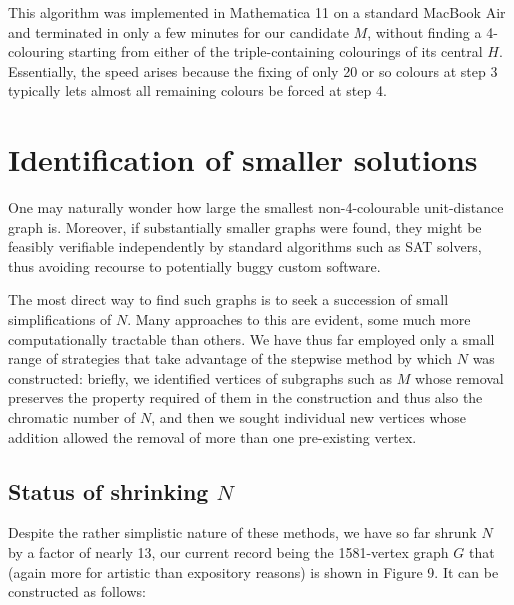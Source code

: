 \documentclass{amsart}
\theoremstyle{definition}
\theoremstyle{remark}
\numberwithin{equation}{section}
\begin{document}
This algorithm was implemented in Mathematica 11 on a standard MacBook Air and terminated in only a few minutes for our candidate $M$, without finding a 4-colouring starting from either of the triple-containing colourings of its central $H$. Essentially, the speed arises because the fixing of only 20 or so colours at step 3 typically lets almost all remaining colours be forced at step 4.

\section{Identification of smaller solutions}

One may naturally wonder how large the smallest non-4-colourable unit-distance graph is. Moreover, if substantially smaller graphs were found, they might be feasibly verifiable independently by standard algorithms such as SAT solvers, thus avoiding recourse to potentially buggy custom software.

The most direct way to find such graphs is to seek a succession of small simplifications of $N$. Many approaches to this are evident, some much more computationally tractable than others. We have thus far employed only a small range of strategies that take advantage of the stepwise method by which $N$ was constructed: briefly, we identified vertices of subgraphs such as $M$ whose removal preserves the property required of them in the construction and thus also the chromatic number of $N$, and then we sought individual new vertices whose addition allowed the removal of more than one pre-existing vertex.

\subsection{Status of shrinking $N$}

Despite the rather simplistic nature of these methods, we have so far shrunk $N$ by a factor of nearly 13, our current record being the 1581-vertex graph $G$ that (again more for artistic than expository reasons) is shown in Figure 9. It can be constructed as follows:
\end{document}

